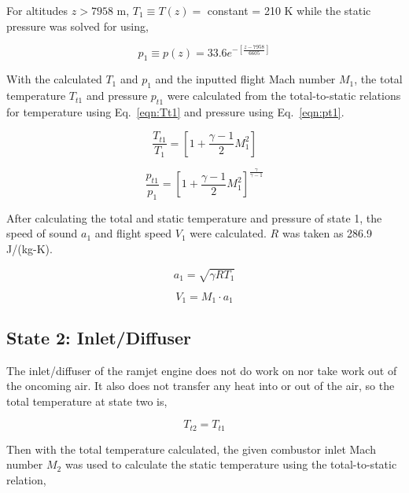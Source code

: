 \documentclass[conf]{new-aiaa} %
\begin{document}
For altitudes $z>7958$ m, $T_1\equiv T(z)=$ constant = 210 K while the static pressure was solved for using,

\begin{equation}
    \label{eqn:p1_high}
    p_1\equiv p(z)=33.6e^{-\left[\frac{z-7958}{6605}\right]}
\end{equation}

With the calculated $T_1$ and $p_1$ and the inputted flight Mach number $M_1$, the total temperature $T_{t1}$ and pressure $p_{t1}$ were calculated from the total-to-static relations for temperature using Eq.~\eqref{eqn:Tt1} and pressure using Eq.~\eqref{eqn:pt1}.

\begin{equation}
    \label{eqn:Tt1}
    \frac{T_{t1}}{T_1}=\left[1+\frac{\gamma-1}{2}M_1^2\right]
\end{equation}

\begin{equation}
    \label{eqn:pt1}
    \frac{p_{t1}}{p_1}=\left[1+\frac{\gamma-1}{2}M_1^2\right]^\frac{\gamma}{\gamma-1}
\end{equation}

After calculating the total and static temperature and pressure of state 1, the speed of sound $a_1$ and flight speed $V_1$ were calculated. $R$ was taken as 286.9 J/(kg-K).

\begin{equation}
    \label{eqn:a1}
    a_1=\sqrt{\gamma RT_1}
\end{equation}

\begin{equation}
    \label{eqn:V1}
    V_1=M_1\cdot a_1
\end{equation}

\subsection{State 2: Inlet/Diffuser}
The inlet/diffuser of the ramjet engine does not do work on nor take work out of the oncoming air. It also does not transfer any heat into or out of the air, so the total temperature at state two is,

\begin{equation}
    \label{eqn:Tt2}
    T_{t2}=T_{t1}
\end{equation}

Then with the total temperature calculated, the given combustor inlet Mach number $M_2$ was used to calculate the static temperature using the total-to-static relation,
\end{document}
